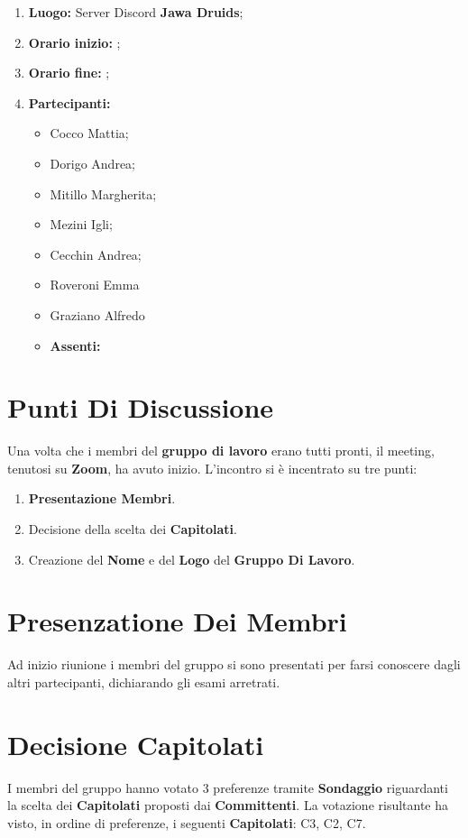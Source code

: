 \documentclass[a4paper,12pt]{report}
\begin{document}
	\makeatother	
	\newpage
	\begin{enumerate}
		\item \textbf{Luogo:} \normalfont Server Discord \textbf{Jawa Druids};
		\item \textbf{Orario inizio:} ;
		\item \textbf{Orario fine:} ;
		\item \textbf{Partecipanti:}
		\begin{itemize}
			\item Cocco Mattia;
			\item Dorigo Andrea;
			\item Mitillo Margherita;
			\item Mezini Igli;
			\item Cecchin Andrea;
			\item Roveroni Emma
			\item Graziano Alfredo
		\end{itemize}
		\begin{itemize}
			\item \textbf{Assenti:}
		\end{itemize}
	\end{enumerate}
	\newpage
	\tableofcontents{}
	\chapter{Punti Di Discussione}
	Una volta che i membri del \textbf{gruppo di lavoro} erano tutti pronti, il meeting, tenutosi su \textbf{Zoom}, ha avuto inizio.
	L'incontro si è incentrato su tre punti:
	\begin{enumerate}
		\item \textbf{Presentazione Membri}.		
		\item Decisione della scelta dei \textbf{Capitolati}.
		\item Creazione del \textbf{Nome} e del \textbf{Logo} del \textbf{Gruppo Di Lavoro}.
	\end{enumerate}

	\chapter{Presenzatione Dei Membri}
	Ad inizio riunione i membri del gruppo si sono presentati per farsi conoscere dagli altri partecipanti, dichiarando gli esami arretrati.
	
	\chapter{Decisione Capitolati}
	I membri del gruppo hanno votato 3 preferenze tramite \textbf{Sondaggio} riguardanti la scelta dei \textbf{Capitolati} proposti dai \textbf{Committenti}.
	La votazione risultante ha visto, in ordine di preferenze, i seguenti \textbf{Capitolati}: C3, C2, C7.
	 
\end{document}
